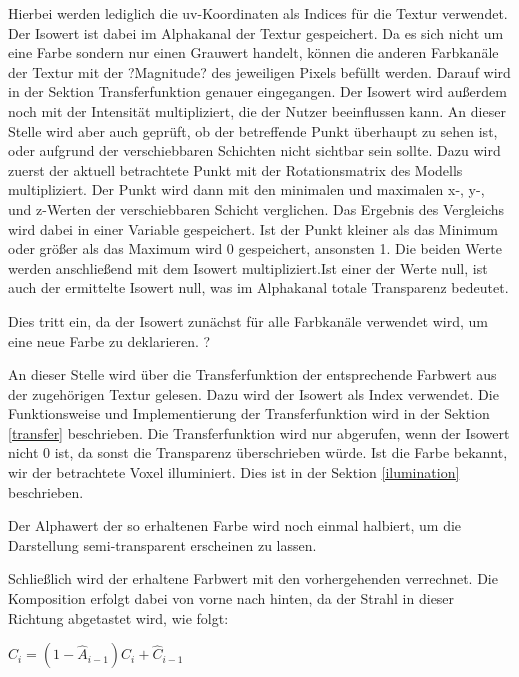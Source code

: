 Hierbei werden lediglich die uv-Koordinaten als Indices für die Textur verwendet. 
Der Isowert ist dabei im Alphakanal der Textur gespeichert. Da es sich nicht um eine Farbe sondern nur einen Grauwert handelt, können die anderen Farbkanäle der Textur mit der ?Magnitude? des jeweiligen Pixels befüllt werden. Darauf wird in der Sektion Transferfunktion genauer eingegangen.
Der Isowert wird außerdem noch mit der Intensität multipliziert, die der Nutzer beeinflussen kann.
An dieser Stelle wird aber auch geprüft, ob der betreffende Punkt überhaupt zu sehen ist, oder aufgrund der verschiebbaren Schichten nicht sichtbar sein sollte. 
Dazu wird zuerst der aktuell betrachtete Punkt mit der Rotationsmatrix des Modells multipliziert.
Der Punkt wird dann mit den minimalen und maximalen x-, y-, und z-Werten der verschiebbaren Schicht verglichen. Das Ergebnis des Vergleichs wird dabei in einer Variable gespeichert. Ist der Punkt kleiner als das Minimum oder größer als das Maximum wird 0 gespeichert, ansonsten 1. 
Die beiden Werte werden anschließend mit dem Isowert multipliziert.Ist einer der Werte null, ist auch der ermittelte Isowert null, was im Alphakanal totale Transparenz bedeutet. 


Dies tritt ein, da der Isowert zunächst für alle Farbkanäle verwendet wird, um eine neue Farbe zu deklarieren. ?

An dieser Stelle wird über die Transferfunktion der entsprechende Farbwert aus der zugehörigen Textur gelesen. Dazu wird der Isowert als Index verwendet. Die Funktionsweise und Implementierung der Transferfunktion wird in der Sektion \ref{transfer} beschrieben.
Die Transferfunktion wird nur abgerufen, wenn der Isowert nicht 0 ist, da sonst die Transparenz überschrieben würde.
Ist die Farbe bekannt, wir der betrachtete Voxel illuminiert. Dies ist in der Sektion \ref{ilumination} beschrieben. 

Der Alphawert der so erhaltenen Farbe wird noch einmal halbiert, um die Darstellung semi-transparent erscheinen zu lassen.

Schließlich wird der erhaltene Farbwert mit den vorhergehenden verrechnet. Die Komposition erfolgt dabei von vorne nach hinten, da der Strahl in dieser Richtung abgetastet wird, wie folgt:

$\hat{C}_{i}=(1-\hat{A}_{i-1})C_{i}+\hat{C}_{i-1}$

